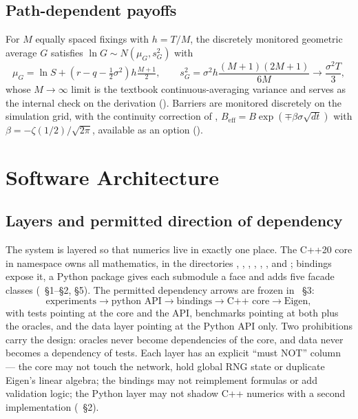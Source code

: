 \documentclass[11pt,a4paper]{article}
\begin{document}
\subsection{Path-dependent payoffs}
For $M$ equally spaced fixings with $h = T/M$, the discretely monitored geometric average $G$
satisfies $\ln G \sim N(\mu_G, s_G^2)$ with
\begin{equation}
\mu_G = \ln S + (r - q - \tfrac12\sigma^2) h \tfrac{M+1}{2}, \qquad
s_G^2 = \sigma^2 h \frac{(M+1)(2M+1)}{6M} \longrightarrow \frac{\sigma^2 T}{3},
\end{equation}
whose $M \to \infty$ limit is the textbook continuous-averaging variance and serves as the
internal check on the derivation ().
Barriers are monitored discretely on the simulation grid, with the continuity correction of
\citet{broadie1997continuity}, $B_{\mathrm{eff}} = B \exp(\mp \beta \sigma \sqrt{dt})$ with
$\beta = -\zeta(1/2)/\sqrt{2\pi}$, available as an option
().

\section{Software Architecture}
\label{sec:architecture}

\subsection{Layers and permitted direction of dependency}
The system is layered so that numerics live in exactly one place. The C++20 core in namespace
 owns all mathematics, in the directories , ,
, , , ,  and
; bindings expose it, a Python package gives each submodule a face and adds five
facade classes (~\S1--\S2, \S5). The permitted dependency arrows are
frozen in ~\S3:
\begin{equation*}
\text{experiments} \rightarrow \text{python API} \rightarrow \text{bindings}
\rightarrow \text{C++ core} \rightarrow \text{Eigen},
\end{equation*}
with tests pointing at the core and the API, benchmarks pointing at both plus the oracles, and
the data layer pointing at the Python API only. Two prohibitions carry the design: oracles
never become dependencies of the core, and data never becomes a dependency of tests. Each
layer has an explicit ``must NOT'' column --- the core may not touch the network, hold global
RNG state or duplicate Eigen's linear algebra; the bindings may not reimplement formulas or add
validation logic; the Python layer may not shadow C++ numerics with a second implementation
(~\S2).
\end{document}
